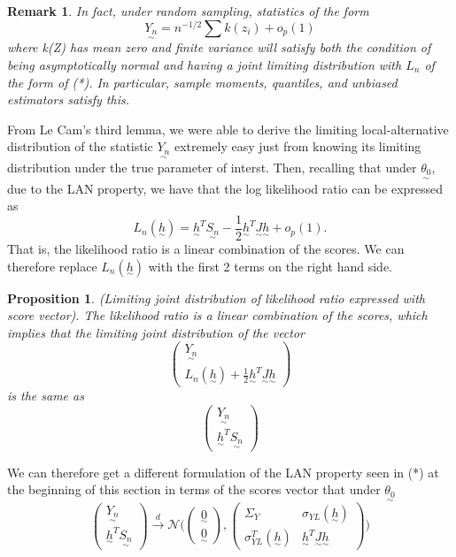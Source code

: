 \documentclass[twoside]{article}
\newtheorem{proposition}[theorem]{Proposition}
\newtheorem{remark}[theorem]{Remark}
\newcommand{\utilde}{\underset{\sim}}
\begin{document}
\begin{remark} In fact, under random sampling, statistics of the form 
$$
\utilde{Y_n} = n^{-1/2}\sum k(z_i) + o_p(1)
$$
where k(Z) has mean zero and finite variance will satisfy both the condition of being asymptotically normal and having a joint limiting distribution with $L_n$ of the form of (*). In particular, sample moments, quantiles, and unbiased estimators satisfy this.
\end{remark}

From Le Cam's third lemma, we were able to derive the limiting local-alternative distribution of the statistic $\utilde{Y_n}$ extremely easy just from knowing its limiting distribution under the true parameter of interst. Then, recalling that under $\utilde{\theta_0}$, due to the LAN property, we have that the log likelihood ratio can be expressed as $$L_n(\utilde{h}) = \utilde{h}^T\utilde{S_n} - \frac{1}{2}\utilde{h}^T\utilde{J}\utilde{h} + o_p(1).$$ That is, the likelihood ratio is a linear combination of the scores. We can therefore replace $L_n(\utilde{h})$ with the first 2 terms on the right hand side. 

\begin{proposition}(Limiting joint distribution of likelihood ratio expressed with score vector).
The likelihood ratio is a linear combination of the scores, which implies that the limiting joint distribution of the vector
$$
\begin{pmatrix}
\utilde{Y_n}\\
L_n(\utilde{h}) + \frac{1}{2}\utilde{h}^T\utilde{J}\utilde{h}
\end{pmatrix}
$$
is the same as 
$$
\begin{pmatrix}
\utilde{Y_n}\\
\utilde{h}^T\utilde{S_n}
\end{pmatrix}
$$
\end{proposition}

We can therefore get a different formulation of the LAN property seen in (*) at the beginning of this section in terms of the scores vector that under $\utilde{\theta_0}$
\begin{equation}
\begin{pmatrix}
\utilde{Y_n}\\
\utilde{h}^T\utilde{S_n}
\end{pmatrix}
 \xrightarrow{d} \mathcal{N}
\bigg( 
\begin{pmatrix}
\utilde{0} \\ \utilde{0}
\end{pmatrix}
,
\begin{pmatrix}
\Sigma_Y & \sigma_{YL}(\utilde{h}) \\
\sigma_{YL}^T(\utilde{h}) & \utilde{h}^T\utilde{J}\utilde{h}
\end{pmatrix}
\bigg)
\tag{**}
\end{equation}
\end{document}

